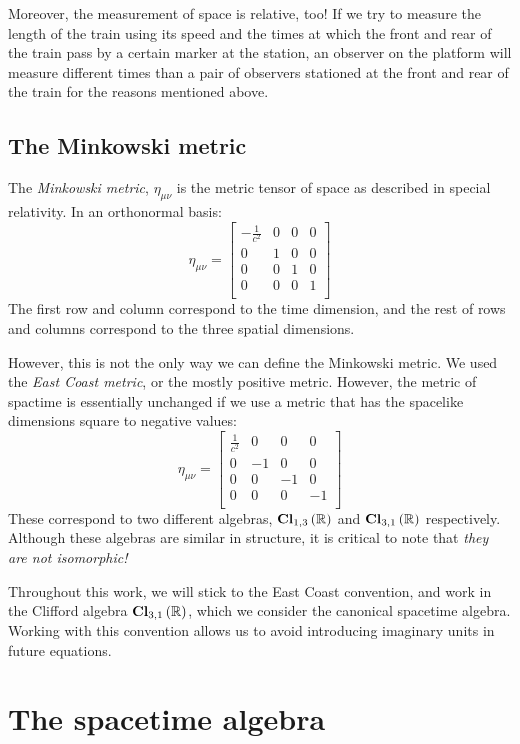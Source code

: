 Moreover, the measurement of space is relative, too! If we try to measure the length of the train
using its speed and the times at which the front and rear of the train pass by a certain marker at
the station, an observer on the platform will measure different times than a pair of observers
stationed at the front and rear of the train for the reasons mentioned above.

\subsection{The Minkowski metric}

The \textit{Minkowski metric}, $\eta_{\mu\nu}$ is the metric tensor of space as described in special
relativity. In an orthonormal basis:
$$
\eta_{\mu\nu} = \begin{bmatrix}
    -\frac{1}{c^2} & 0 & 0 & 0 \\
    0 & 1 & 0 & 0 \\
    0 & 0 & 1 & 0 \\
    0 & 0 & 0 & 1 \\
\end{bmatrix}
$$
The first row and column correspond to the time dimension, and the rest of rows and columns
correspond to the three spatial dimensions.

However, this is not the only way we can define the Minkowski metric. We used the \textit{East Coast
metric}, or the mostly positive metric. However, the metric of spactime is essentially unchanged if
we use a metric that has the spacelike dimensions square to negative values:
$$
\eta_{\mu\nu} = \begin{bmatrix}
    \frac{1}{c^2} & 0 & 0 & 0 \\
    0 & -1 & 0 & 0 \\
    0 & 0 & -1 & 0 \\
    0 & 0 & 0 & -1 \\
\end{bmatrix}
$$
These correspond to two different algebras, $\operatorname{\mathbf{Cl}}_{1,3}\left(\mathbb{R}\right)$ and $\operatorname{\mathbf{Cl}}_{3,1}\left(\mathbb{R}\right)$ respectively. Although these
algebras are similar in structure, it is critical to note that \textit{they are not isomorphic!}

Throughout this work, we will stick to the East Coast convention, and work in the Clifford algebra
$\operatorname{\mathbf{Cl}}_{3,1}\left(\mathbb{R}\right)$, which we consider the canonical spacetime algebra. Working with this convention allows
us to avoid introducing imaginary units in future equations.

\section{The spacetime algebra}

